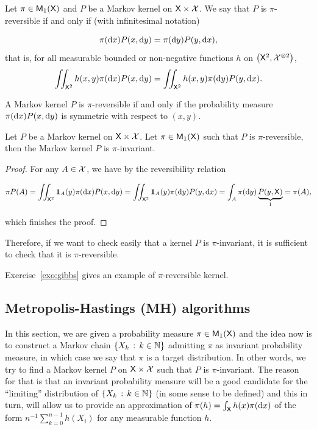 \documentclass[english,graybox,envcountchap,envcountsame,sectrefs,shortlabels]{svmono}
\theoremstyle{style}
\newcommand{\bs}{\begin{shaded}}
\newcommand{\es}{\end{shaded}}
\begin{document}
\begin{definition}
Let $\pi\in\mathsf{M}_{1}(\mathsf{X})$ and $P$ be a Markov kernel on $\mathsf{X}\times\mathcal{X}$.
We say that $P$ is $\pi$-reversible if and only if (with infinitesimal
notation)

\begin{equation}
\pi(\mathrm{d} x)P(x,\mathrm{d} y)=\pi(\mathrm{d} y)P(y,\mathrm{d} x),\label{eq:reversibility}
\end{equation}
that is, for all measurable bounded or non-negative functions $h$
on $\left(\mathsf{X}^{2},\mathcal{X}^{\otimes2}\right)$,
\begin{equation}
\iint_{\mathsf{X}^{2}}h(x,y)\pi(\mathrm{d} x)P(x,\mathrm{d} y)=\iint_{\mathsf{X}^{2}}h(x,y)\pi(\mathrm{d} y)P(y,\mathrm{d} x).\label{eq:reversibility:h}
\end{equation}
\end{definition}
A Markov kernel $P$ is $\pi$-reversible if and only
if the probability measure $\pi(\mathrm{d} x)P(x,\mathrm{d} y)$ is symmetric
with respect to $(x,y)$. %
\begin{proposition}
Let $P$ be a Markov kernel on $\mathsf{X}\times\mathcal{X}$. Let $\pi\in\mathsf{M}_{1}(\mathsf{X})$
such that $P$ is $\pi$-reversible, then the Markov kernel $P$ is
$\pi$-invariant.
\end{proposition}
\begin{proof}
For any $A\in\mathcal{X}$, we have by the reversibility relation

\[
\pi P(A)=\iint_{\mathsf{X}^{2}}\mathbf{1}_{A}(y)\pi(\mathrm{d} x)P(x,\mathrm{d} y)=\iint_{\mathsf{X}^{2}}\mathbf{1}_{A}(y)\pi(\mathrm{d} y)P(y,\mathrm{d} x)=\int_{A}\pi(\mathrm{d} y)\underbrace{P(y,\mathsf{X})}_{1}=\pi(A),
\]

which finishes the proof.
\end{proof}


Therefore, if we want to check easily that
a kernel $P$ is $\pi$-invariant, it is sufficient to check that
it is $\pi$-reversible.


Exercise~\ref{exo:gibbs} gives an example of $\pi$-reversible kernel.

\subsection{Metropolis-Hastings (MH) algorithms}
\label{sec:MH}
In this section, we are given a probability measure $\pi\in\mathsf{M}_{1}(\mathsf{X})$
and the idea now is to construct a Markov chain $\left\{ X_{k}\,:\,k\in\mathbb{N}\right\}$
admitting $\pi$ as invariant probability measure, in which case we
say that $\pi$ is a target distribution. In other words, we try to
find a Markov kernel $P$ on $\mathsf{X}\times\mathcal{X}$ such that $P$
is $\pi$-invariant. The reason for that is that an invariant probability
measure will be a good candidate for the ``limiting'' distribution
of $\left\{ X_{k}\,:\,k\in\mathbb{N}\right\}$ (in some sense to be defined) and this
in turn, will allow us to provide an approximation of $\pi(h)=\int_{\mathsf{X}}h(x)\pi(\mathrm{d} x)$ of the form $n^{-1}\sum_{k=0}^{n-1}h(X_{i})$ for any measurable function $h$. 
\end{document}
